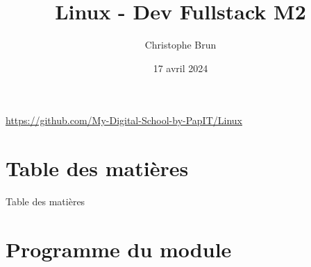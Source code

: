 \documentclass{beamer}
\title[Linux]{Linux - Dev Fullstack M2}
\author{Christophe Brun}
\institute{My Digital School}
\date{17 avril 2024}
\begin{document}
    \begin{frame}
        \titlepage
        \bigbreak
        \centering
        \url{https://github.com/My-Digital-School-by-PapIT/Linux}
    \end{frame}


    \section{Table des matières}\label{sec:toc}

    \begin{frame}{Table des matières}
        \begin{tiny}
            \begin{multicols}{3}
                \tableofcontents
            \end{multicols}
        \end{tiny}
    \end{frame}


    \section{Programme du module}\label{sec:programme-du-module}
\end{document}
